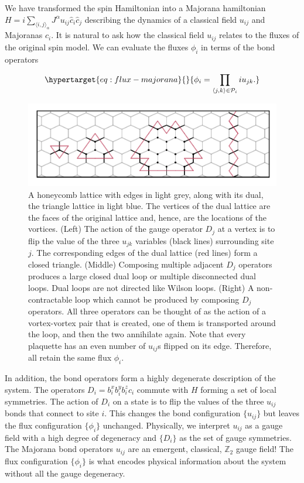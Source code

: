 We have transformed the spin Hamiltonian into a Majorana hamiltonian \(H = i \sum_{\langle i,j\rangle_\alpha} J^{\alpha} u_{ij} \hat{c}_i \hat{c}_j\) describing the dynamics of a classical field \(u_{ij}\) and Majoranas \(c_i\). It is natural to ask how the classical field \(u_{ij}\) relates to the fluxes of the original spin model. We can evaluate the fluxes \(\phi_i\) in terms of the bond operators

\begin{equation}\protect\hypertarget{eq:flux-majorana}{}{\phi_i = \prod_{\langle j,k\rangle \in \mathcal{P}_i} i u_{jk}.}\label{eq:flux-majorana}\end{equation}

\hypertarget{fig:gauge_symmetries}{%
\begin{figure}
\centering
\includegraphics[width=1\textwidth,height=\textheight]{figure_code/amk_chapter/intro/gauge_symmetries/gauge_symmetries}
\caption[{Gauge Symmetries}]{A honeycomb lattice with edges in light grey, along with its dual, the triangle lattice in light blue. The vertices of the dual lattice are the faces of the original lattice and, hence, are the locations of the vortices. (Left) The action of the gauge operator \(D_j\) at a vertex is to flip the value of the three \(u_{jk}\) variables (black lines) surrounding site \(j\). The corresponding edges of the dual lattice (red lines) form a closed triangle. (Middle) Composing multiple adjacent \(D_j\) operators produces a large closed dual loop or multiple disconnected dual loops. Dual loops are not directed like Wilson loops. (Right) A non-contractable loop which cannot be produced by composing \(D_j\) operators. All three operators can be thought of as the action of a vortex-vortex pair that is created, one of them is transported around the loop, and then the two annihilate again. Note that every plaquette has an even number of \(u_{ij}\)s flipped on its edge. Therefore, all retain the same flux \(\phi_i\).}
\label{fig:gauge_symmetries}
\end{figure}
}

In addition, the bond operators form a highly degenerate description of the system. The operators \(D_i = b^x_i b^y_i b^z_i c_i\) commute with \(H\) forming a set of local symmetries. The action of \(D_i\) on a state is to flip the values of the three \(u_{ij}\) bonds that connect to site \(i\). This changes the bond configuration \(\{u_{ij}\}\) but leaves the flux configuration \(\{\phi_i\}\) unchanged. Physically, we interpret \(u_{ij}\) as a gauge field with a high degree of degeneracy and \(\{D_i\}\) as the set of gauge symmetries. The Majorana bond operators \(u_{ij}\) are an emergent, classical, \(\mathbb{Z}_2\) gauge field! The flux configuration \(\{\phi_i\}\) is what encodes physical information about the system without all the gauge degeneracy.

